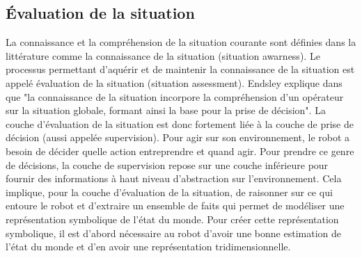 \documentclass[a4paper,11pt,twoside]{StyleThese}
\begin{document}
\subsection{Évaluation de la situation}
La connaissance et la compréhension de la situation courante sont définies dans la littérature comme la connaissance de la situation (situation awarness). Le processus permettant d'aquérir et de maintenir la connaissance de la situation est appelé évaluation de la situation (situation assessment). Endsley explique dans \cite{endsley1995} que "la connaissance de la situation incorpore la compréhension d'un opérateur sur la situation globale, formant ainsi la base pour la prise de décision". La couche d'évaluation de la situation est donc fortement liée à la couche de prise de décision (aussi appelée supervision). Pour agir sur son environnement, le robot a besoin de décider quelle action entreprendre et quand agir. Pour prendre ce genre de décisions, la couche de supervision repose sur une couche inférieure pour fournir des informations à haut niveau d'abstraction sur l'environnement. Cela implique, pour la couche d'évaluation de la situation, de raisonner sur ce qui entoure le robot et d'extraire un ensemble de faits qui permet de modéliser une représentation symbolique de l'état du monde. Pour créer cette représentation symbolique, il est d'abord nécessaire au robot d'avoir une bonne estimation de l'état du monde et d'en avoir une représentation tridimensionnelle.





\end{document}
